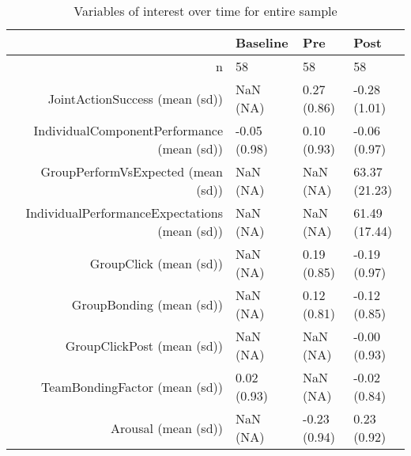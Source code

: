 \begin{table}[ht]
\centering
\begin{tabular}{rlll}
  \hline
 & Baseline & Pre & Post \\ 
  \hline
n &    58 &    58 &    58 \\ 
  JointActionSuccess (mean (sd)) &   NaN (NA) &  0.27 (0.86) & -0.28 (1.01) \\ 
  IndividualComponentPerformance (mean (sd)) & -0.05 (0.98) &  0.10 (0.93) & -0.06 (0.97) \\ 
  GroupPerformVsExpected (mean (sd)) &   NaN (NA) &   NaN (NA) & 63.37 (21.23) \\ 
  IndividualPerformanceExpectations (mean (sd)) &   NaN (NA) &   NaN (NA) & 61.49 (17.44) \\ 
  GroupClick (mean (sd)) &   NaN (NA) &  0.19 (0.85) & -0.19 (0.97) \\ 
  GroupBonding (mean (sd)) &   NaN (NA) &  0.12 (0.81) & -0.12 (0.85) \\ 
  GroupClickPost (mean (sd)) &   NaN (NA) &   NaN (NA) & -0.00 (0.93) \\ 
  TeamBondingFactor (mean (sd)) &  0.02 (0.93) &   NaN (NA) & -0.02 (0.84) \\ 
  Arousal (mean (sd)) &   NaN (NA) & -0.23 (0.94) &  0.23 (0.92) \\ 
   \hline
\end{tabular}
\caption{Variables of interest over time 
 for entire sample} 
\label{tab:factorsTime}
\end{table}

